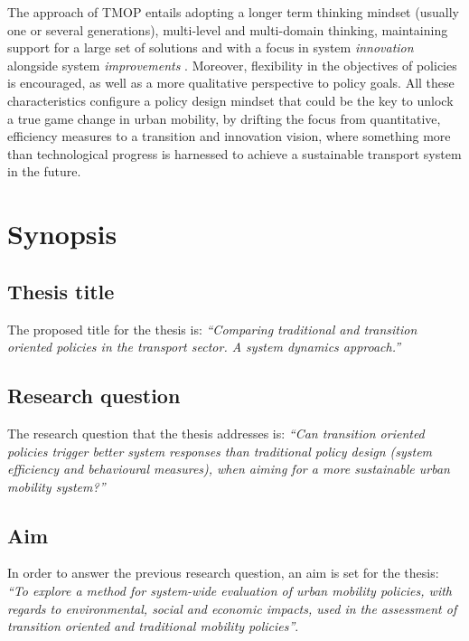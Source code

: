 \begin{multicols}{2}
The approach of TMOP entails adopting a longer term thinking mindset (usually one or several generations), multi-level and multi-domain thinking, maintaining support for a large set of solutions and with a focus in system \textit{innovation} alongside system \textit{improvements} \parencite{rotmans2001_Moreevolutionthan}. Moreover, flexibility in the objectives of policies is encouraged, as well as a more qualitative perspective to policy goals. All these characteristics configure a policy design mindset that could be the key to unlock a true game change in urban mobility, by drifting the focus from quantitative, efficiency measures to a transition and innovation vision, where something more than technological progress is harnessed to achieve a sustainable transport system in the future.

\section{Synopsis}
\label{s:synopsis}
\subsection*{Thesis title}
The proposed title for the thesis is: \textit{``Comparing traditional and transition oriented policies in the transport sector. A system dynamics approach.''}

\subsection*{Research question}
The research question that the thesis addresses is: \textit{``Can transition oriented policies trigger better system responses than traditional policy design (system efficiency and behavioural measures), when aiming for a more sustainable urban mobility system?''}

\subsection*{Aim}
In order to answer the previous research question, an aim is set for the thesis: \textit{``To explore a method for system-wide evaluation of urban mobility policies, with regards to environmental, social and economic impacts, used in the assessment of transition oriented and traditional mobility policies''}.


\end{multicols}
